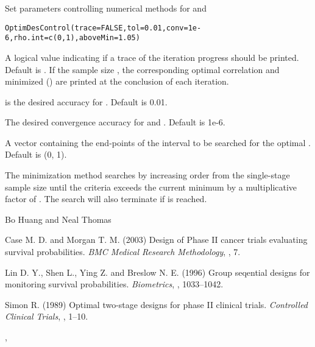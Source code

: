 \begin{Description}\relax
Set parameters controlling numerical methods for  and 
\end{Description}
\begin{Usage}
\begin{verbatim}
OptimDesControl(trace=FALSE,tol=0.01,conv=1e-6,rho.int=c(0,1),aboveMin=1.05)
\end{verbatim}
\end{Usage}
\begin{Arguments}
\begin{ldescription}
\item[\code{trace}] A logical value indicating if a
trace of the iteration
progress should be printed.  Default is .  If
 the sample size , the corresponding optimal
correlation  and minimized () are
printed at the conclusion of each iteration.
\item[\code{tol}]  is the
desired accuracy for . Default is 0.01.
\item[\code{conv}] The desired convergence accuracy for  and
. Default is 1e-6.
\item[\code{rho.int}] A vector containing
the end-points of the interval to
be searched for the optimal . Default is (0, 1).
\item[\code{aboveMin}] The minimization method searches by increasing order
from the single-stage
sample size until the criteria exceeds the current minimum by a 
multiplicative factor of .  The search will also 
terminate if  is reached.
\end{ldescription}
\end{Arguments}
\begin{Author}\relax
Bo Huang  and Neal Thomas
\end{Author}
\begin{References}\relax
Case M. D. and Morgan T. M. (2003) Design of Phase II cancer trials
evaluating survival probabilities. \emph{BMC Medical Research
Methodology}, , 7.

Lin D. Y., Shen L., Ying Z. and Breslow N. E. (1996) Group seqential
designs for monitoring survival probabilities. \emph{Biometrics},
, 1033--1042.

Simon R. (1989) Optimal two-stage designs for phase II clinical
trials. \emph{Controlled Clinical Trials}, , 1--10.
\end{References}
\begin{SeeAlso}\relax
{}, 
\end{SeeAlso}

